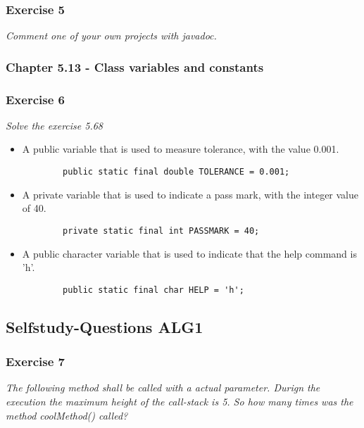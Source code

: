 \subsubsection*{Exercise 5}
\textit{Comment one of your own projects with javadoc.} \\



\subsubsection{Chapter 5.13 - Class variables and constants}

\subsubsection*{Exercise 6}
\textit{Solve the exercise 5.68} \\
\begin{itemize}
	\item A public variable that is used to measure tolerance, with the value 0.001. \\
		\begin{lstlisting}
		public static final double TOLERANCE = 0.001;
		\end{lstlisting}
	\item A private variable that is used to indicate a pass mark, with the integer value of 40.
		\begin{lstlisting}
		private static final int PASSMARK = 40;
		\end{lstlisting}
	\item A public character variable that is used to indicate that the help command is 'h'.
		\begin{lstlisting}
		public static final char HELP = 'h';
		\end{lstlisting}
\end{itemize}

\subsection{Selfstudy-Questions ALG1}

\subsubsection*{Exercise 7}
\textit{The following method shall be called with a actual parameter.
Durign the execution the maximum height of the call-stack is 5.
So how many times was the method coolMethod() called?} \\


